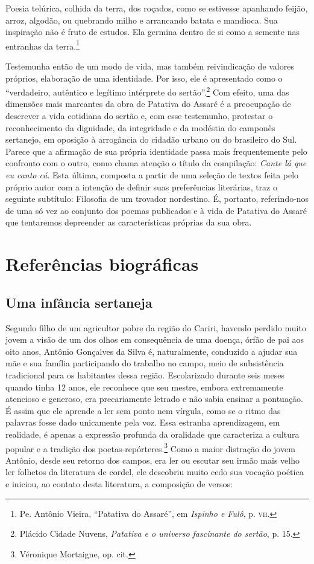 \begin{hedraquote}
Poesia telúrica, colhida da
terra, dos roçados, como se estivesse apanhando feijão, arroz, algodão, ou
quebrando milho e arrancando batata e mandioca. Sua inspiração não é fruto de
estudos. Ela germina dentro de si como a semente nas entranhas da
terra.\footnote{ Pe. Antônio Vieira, “Patativa do Assaré”, em \textit{Ispinho e
Fulô}, p. \textsc{vii}.}
\end{hedraquote}

Testemunha então de um modo de vida, mas também reivindicação de valores
próprios, elaboração de uma identidade. Por isso, ele é apresentado como o
“verdadeiro, autêntico e legítimo intérprete do sertão”.\footnote{ Plácido Cidade
Nuvens, \textit{Patativa e o universo fascinante do sertão}, p. 15.} Com
efeito, uma das dimensões mais marcantes da obra de Patativa do Assaré é a
preocupação de descrever a vida cotidiana do sertão e, com esse testemunho,
protestar o reconhecimento da dignidade, da integridade e da modéstia do
camponês sertanejo, em oposição à arrogância do cidadão urbano ou do brasileiro
do Sul. Parece que a afirmação de sua própria identidade passa mais
frequentemente pelo confronto com o outro, como chama atenção o título da
compilação: \textit{Cante lá que eu canto cá}. Esta última, composta a partir de uma
seleção de textos feita pelo próprio autor com a intenção de definir suas
preferências literárias, traz o seguinte subtítulo: Filosofia de um trovador
nordestino. É, portanto, referindo-nos de uma só vez ao conjunto dos poemas
publicados e à vida de Patativa do Assaré que tentaremos depreender as
características próprias da sua obra.

\section{Referências biográficas}

\subsection{Uma infância sertaneja}

Segundo filho de um agricultor pobre da região do Cariri, havendo perdido muito
jovem a visão de um dos olhos em consequência de uma doença, órfão de pai aos
oito anos, Antônio Gonçalves da Silva é, naturalmente, conduzido a ajudar sua
mãe e sua família participando do trabalho no campo, meio de subsistência
tradicional para os habitantes dessa região. Escolarizado durante seis meses
quando tinha 12 anos, ele reconhece que seu mestre, embora extremamente
atencioso e generoso, era precariamente letrado e não sabia ensinar a pontuação.
É assim que ele aprende a ler sem ponto nem vírgula, como se o ritmo das
palavras fosse dado unicamente pela voz. Essa estranha aprendizagem, em
realidade, é apenas a expressão profunda da oralidade que caracteriza a cultura
popular e a tradição dos poetas-repórteres.\footnote{ Véronique Mortaigne, op.
cit.} Como a maior distração do jovem Antônio, desde seu retorno dos campos,
era ler ou escutar seu irmão mais velho ler folhetos da literatura de cordel,
ele descobriu muito cedo sua vocação poética e iniciou, ao contato desta
literatura, a composição de versos:

